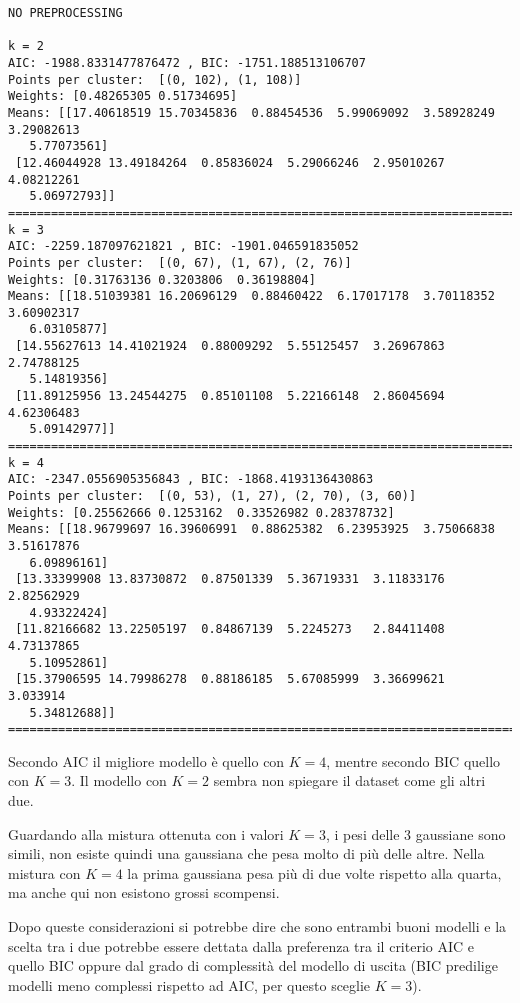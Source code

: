 \documentclass{report}
\begin{document}
    \begin{Verbatim}[commandchars=\\\{\}]
NO PREPROCESSING

k = 2
AIC: -1988.8331477876472 , BIC: -1751.188513106707
Points per cluster:  [(0, 102), (1, 108)]
Weights: [0.48265305 0.51734695]
Means: [[17.40618519 15.70345836  0.88454536  5.99069092  3.58928249  3.29082613
   5.77073561]
 [12.46044928 13.49184264  0.85836024  5.29066246  2.95010267  4.08212261
   5.06972793]]
=======================================================================
k = 3
AIC: -2259.187097621821 , BIC: -1901.046591835052
Points per cluster:  [(0, 67), (1, 67), (2, 76)]
Weights: [0.31763136 0.3203806  0.36198804]
Means: [[18.51039381 16.20696129  0.88460422  6.17017178  3.70118352  3.60902317
   6.03105877]
 [14.55627613 14.41021924  0.88009292  5.55125457  3.26967863  2.74788125
   5.14819356]
 [11.89125956 13.24544275  0.85101108  5.22166148  2.86045694  4.62306483
   5.09142977]]
=======================================================================
k = 4
AIC: -2347.0556905356843 , BIC: -1868.4193136430863
Points per cluster:  [(0, 53), (1, 27), (2, 70), (3, 60)]
Weights: [0.25562666 0.1253162  0.33526982 0.28378732]
Means: [[18.96799697 16.39606991  0.88625382  6.23953925  3.75066838  3.51617876
   6.09896161]
 [13.33399908 13.83730872  0.87501339  5.36719331  3.11833176  2.82562929
   4.93322424]
 [11.82166682 13.22505197  0.84867139  5.2245273   2.84411408  4.73137865
   5.10952861]
 [15.37906595 14.79986278  0.88186185  5.67085999  3.36699621  3.033914
   5.34812688]]
=======================================================================
    \end{Verbatim}

    Secondo AIC il migliore modello è quello con \(K=4\), mentre secondo BIC
quello con \(K=3\). Il modello con \(K=2\) sembra non spiegare il
dataset come gli altri due.

Guardando alla mistura ottenuta con i valori \(K=3\), i pesi delle 3
gaussiane sono simili, non esiste quindi una gaussiana che pesa molto di
più delle altre. Nella mistura con \(K=4\) la prima gaussiana pesa più
di due volte rispetto alla quarta, ma anche qui non esistono grossi
scompensi.

Dopo queste considerazioni si potrebbe dire che sono entrambi buoni
modelli e la scelta tra i due potrebbe essere dettata dalla preferenza
tra il criterio AIC e quello BIC oppure dal grado di complessità del
modello di uscita (BIC predilige modelli meno complessi rispetto ad AIC,
per questo sceglie \(K=3\)).
\end{document}
